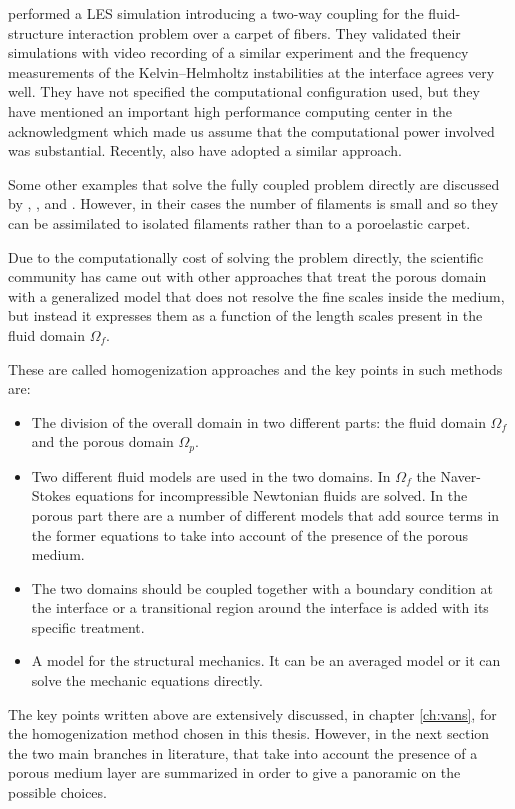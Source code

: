 \citet{dupont2010modelling} performed a LES simulation introducing a two-way coupling for the fluid-structure interaction problem over a carpet of fibers. They validated their simulations with video recording of a similar experiment and the frequency measurements of the Kelvin–Helmholtz instabilities at the interface agrees very well.
They have not specified the computational configuration used, but they have mentioned an important high performance computing center in the acknowledgment which made us assume that the computational power involved was substantial.
Recently, also \citet{marjoribanks2017does} have adopted a similar approach.

Some other examples that solve the fully coupled problem directly are discussed by \citet{monti2017large}, \citet{pinelli2017pelskin}, \citet{favier2017pelskin} and \citet{revell2017pelskin}. However, in their cases the number of filaments is small and so they can be assimilated to isolated filaments rather than to a poroelastic carpet.

Due to the computationally cost of solving the problem directly, the scientific community has came out with other approaches that treat the porous domain with a generalized model that does not resolve the fine scales inside the medium, but instead it expresses them as a function of the length scales present in the fluid domain $\Omega_{f}$.

These are called homogenization approaches and the key points in such methods are:
\begin{itemize}
	\item The division of the overall domain in two different parts: the fluid domain $\Omega_{f}$ and the porous domain $\Omega_{p}$.
	\item Two different fluid models are used in the two domains. In $\Omega_{f}$ the Naver-Stokes equations for incompressible Newtonian fluids are solved. In the porous part there are a number of different models that add source terms in the former equations to take into account of the presence of the porous medium.
	\item The two domains should be coupled together with a boundary condition at the interface or a transitional region around the interface is added with its specific treatment.
	\item A model for the structural mechanics. It can be an averaged model or it can solve the mechanic equations directly.
\end{itemize}

The key points written above are extensively discussed, in chapter \ref{ch:vans}, for the homogenization method chosen in this thesis.
However, in the next section the two main branches in literature, that take into account the presence of a porous medium layer are summarized in order to give a panoramic on the possible choices.


